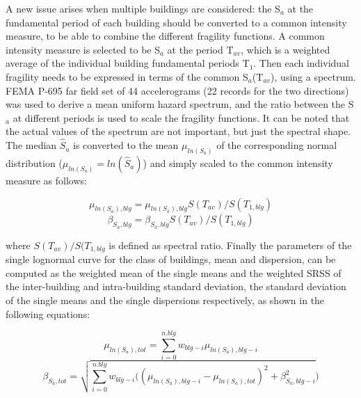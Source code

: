 A new issue arises when multiple buildings are considered: the S$_a$ at the fundamental period of each building should be converted to a common intensity measure, to be able to combine the different fragility functions. A common intensity measure is selected to be S$_a$ at the period T$_{av}$, which is a weighted average of the individual building fundamental periods T$_1$. Then each individual fragility needs to be expressed in terms of the common S$_a$(T$_{av}$), using a spectrum. FEMA P-695 \citep{ATC2007} far field set of 44 accelerograms (22 records for the two directions) was used to derive a mean uniform hazard spectrum, and the ratio between the S$_a$ at different periods is used to scale the fragility functions. It can be noted that the actual values of the spectrum are not important, but just the spectral shape. 
The median $\hat{S}_a$ is converted to the mean $\mu_{ln(S_a)}$ of the corresponding normal distribution ($\mu_{ln(S_a)} = ln(\hat{S}_a)$) and simply scaled to the common intensity measure as follows:

\begin{equation}
\mu_{ln(S_a), blg} = \mu_{ln(S_a), blg} S(T_{av})/ S(T_{1, blg})
\end{equation}
\begin{equation}
\beta_{S_a, blg} = \beta_{S_a, blg} S(T_{av})/ S(T_{1, blg})
\label{eq:Sa(Tav)}
\end{equation}

where $S(T_{av})/ S(T_{1, blg}$ is defined as spectral ratio. Finally the parameters of the single lognormal curve for the class of buildings, mean and dispersion, can be computed as the weighted mean of the single means and the weighted SRSS of the inter-building and intra-building standard deviation, the standard deviation of the single means and the single dispersions respectively, as shown in the following equations:

\begin{equation}
\mu_{ln(S_a), tot} = \sum_{i=0}^{n.blg} w_{blg-i} \mu_{ln(S_a), blg-i}
\label{eq:combination-lognormals-mu}
\end{equation}
\begin{equation}
\beta_{S_a, tot} = \sqrt{ \sum_{i=0}^{n.blg} w_{blg-i} ((\mu_{ln(S_a), blg-i}-\mu_{ln(S_a), tot})^2+ \beta_{S_a, blg-i}^2})
\label{eq:combination-lognormals-sigma}
\end{equation}

